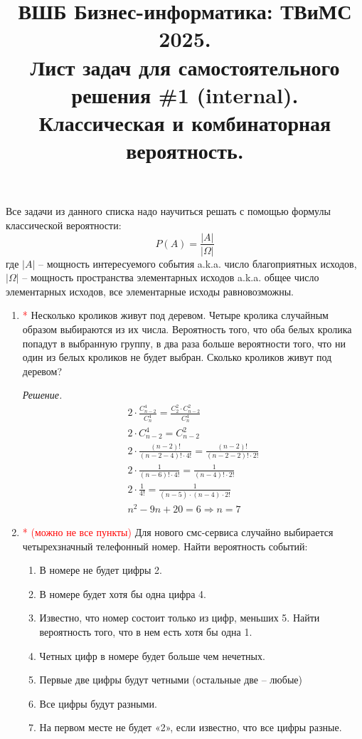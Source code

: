 \documentclass{article}
\title{ВШБ Бизнес-информатика: ТВиМС 2025. \\ Лист задач для самостоятельного решения \#1 (internal). \\ Классическая и комбинаторная вероятность.}
\date{}
\author{}
\begin{document}
\maketitle
Все задачи из данного списка надо научиться решать с помощью формулы классической вероятности:
$$
    P(A) = \frac{|A|}{|\Omega|}
$$
где $|A|$ -- мощность интересуемого события a.k.a. число благоприятных исходов, $|\Omega|$ -- мощность пространства элементарных исходов a.k.a. общее число элементарных исходов, все элементарные исходы равновозможны.


\begin{enumerate}

    
    \item \textcolor{red}{*} Несколько кроликов живут под деревом. Четыре кролика случайным образом выбираются из их числа. Вероятность того, что оба белых кролика попадут в выбранную группу, в два раза больше вероятности того, что ни один из белых кроликов не будет выбран. Сколько кроликов живут под деревом?
    
    \textit{Решение.} 
    \begin{gather*}
    2 \cdot \frac{C_{n-2}^4}{C_n^4} = \frac{C_2^2 \cdot C_{n-2}^2}{C_n^4} \\ 
    2 \cdot C_{n-2}^4 = C_{n-2}^2 \\
    2 \cdot \frac{(n-2)!}{(n-2-4)! \cdot 4!} = \frac{(n-2)!}{(n-2-2)! \cdot 2!} \\
    2 \cdot \frac{1}{(n-6)! \cdot 4!} = \frac{1}{(n-4)! \cdot 2!} \\
    2 \cdot \frac{1}{4!} = \frac{1}{(n-5) \cdot (n-4) \cdot 2!} \\
    n^2 - 9n + 20 = 6 \Longrightarrow n = 7
    \end{gather*}

    \item \textcolor{red}{* (можно не все пункты)} Для нового смс-сервиса случайно выбирается четырехзначный телефонный номер. Найти вероятность событий:
    \begin{enumerate}
        \item В номере не будет цифры 2.
        \item В номере будет хотя бы одна цифра 4.
        \item Известно, что номер состоит только из цифр, меньших 5. Найти вероятность того, что в нем есть хотя бы одна 1.
        \item Четных цифр в номере будет больше чем нечетных.
        \item Первые две цифры будут четными (остальные две -- любые)
        \item Все цифры будут разными.
        \item На первом месте не будет «2», если известно, что все цифры разные.
    \end{enumerate}


\end{enumerate}
\end{document}
